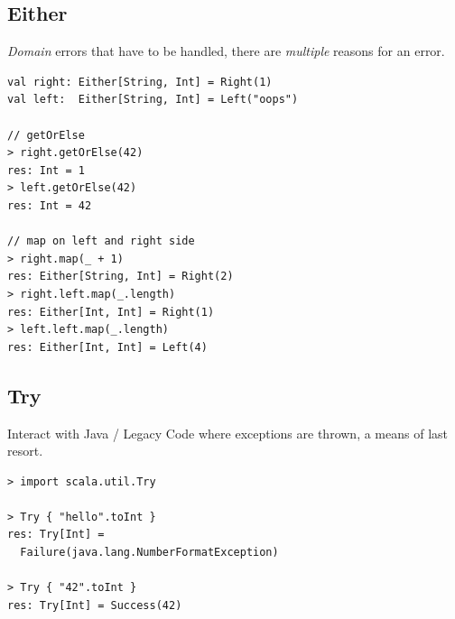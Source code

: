 \documentclass[10pt,landscape,a4paper]{article}
\begin{document}
\begin{multicols*}{4}
\begin{verbatim}
\end{verbatim}
  \subsection{Either}
  \begin{mdframed}
    \textit{Domain} errors that have to be handled, there are
    \textit{multiple} reasons for an error.
  \end{mdframed}
  \begin{center}
  \end{center}
\begin{verbatim}
val right: Either[String, Int] = Right(1)
val left:  Either[String, Int] = Left("oops")

// getOrElse
> right.getOrElse(42)
res: Int = 1
> left.getOrElse(42)
res: Int = 42

// map on left and right side
> right.map(_ + 1)
res: Either[String, Int] = Right(2)
> right.left.map(_.length)
res: Either[Int, Int] = Right(1)
> left.left.map(_.length)
res: Either[Int, Int] = Left(4)
\end{verbatim}
  \subsection{Try}
  \begin{mdframed}
    Interact with Java / Legacy Code where exceptions are thrown, a
    means of last resort.
  \end{mdframed}
  \begin{center}
  \end{center}
\begin{verbatim}
> import scala.util.Try

> Try { "hello".toInt }
res: Try[Int] =
  Failure(java.lang.NumberFormatException)

> Try { "42".toInt }
res: Try[Int] = Success(42)
\end{verbatim}


\end{multicols*}
\end{document}
